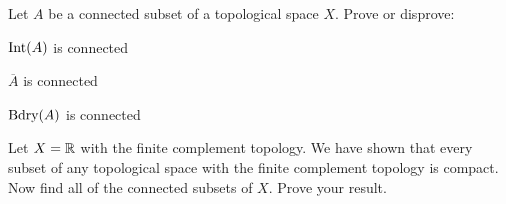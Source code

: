 \item Let $A$ be a connected subset of a topological space $X$. Prove or disprove:
\ba
\item $\text{Int}(A)$ is connected

\item $\overline{A}$ is connected

\item $\text{Bdry}(A)$ is connected


\ea

\begin{comment}

\ExerciseSolution

\ba

\item Let $X = \{a,b,c,d,e,f\}$ with topology $\{\emptyset, \{a,b\}, \{c,d\}, \{a,b,e\}, \{c,d,e\}, \{a,b,c,d\}, X\}$. Let $A = \{a,b,c,d,f\}$. The only open set that contains $A$ is $X$, so $A$ is connected. The open sets $\{a,b\}$ and $\{c,d\}$ are contained in $A$, so $a$, $b$, $c$, and $d$ are interior points of $A$.  However, the only open set containing $f$ is $X$, so $f$ is not an interior point of $A$. Thus, $\Int(A) = \{a,b,c,d\} = \{a,b\} \cup \{c,d\}$ and $\Int(A)$ is disconnected.

\item This statement is true by the theorem that states that if $C$ is a subset of $X$ and $A \subseteq C \subseteq \overline{A}$, then $C$ is connected. 

\item Let $A = [0,1]$ in $\R$ with the Euclidean topology. Then $\Bdry(A) = \{0,1\}$ is disconnected.

\ea

\end{comment}


\item Let $X = \mathbb{R}$ with the finite complement topology. We have shown that every subset of any topological space with the finite complement topology is compact. Now find all of the connected subsets of $X$. Prove your result.

